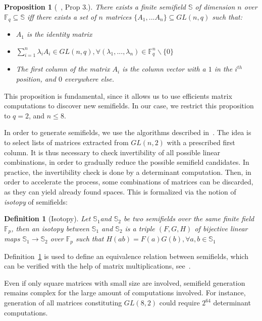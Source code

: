 \documentclass{article}\usepackage{amsthm}
\newtheorem{mydef}{Definition}
\newtheorem{mypropo}{Proposition}
\begin{document}
\begin{mypropo}[~\cite{Combarro:2011:advances_sf}, Prop 3.]
There exists a finite semifield $\mathbb{S}$ of dimension $n$ over $ \mathbb{F}_q \subseteq \mathbb{S} $ iff there exists a set of $n$ matrices  $\{A_1,...A_n\} \subseteq GL(n,q)$ such that: 
\begin{itemize}
\item $A_1$ is the identity matrix
\item $\displaystyle\sum_{i=1}^n \lambda_iA_i \in GL(n,q), \forall (\lambda_1,...,\lambda_n) \in \mathbb{F}_q^n  \backslash \{0\} $ 
\item The first column of the matrix $A_i$ is the column vector with a $1$ in the $i^{th}$ position, and $0$ everywhere else.\\
\end{itemize}
\end{mypropo}


This proposition is fundamental, since it allows us to use efficients matrix computations to discover new semifields.
In our case, we restrict this proposition to $q=2$, and $n \le 8 $. 

In order to generate semifields, we use the algorithms described in~\cite{Rua:2009:classification_sf}. 
The idea is to select lists of matrices extracted from $GL(n,2)$ with a prescribed first column.
It is thus necessary to check invertibility of all possible linear combinations, in order to gradually reduce the possible semifield candidates.
In practice, the invertibility check is done by a determinant computation.
Then, in order to accelerate the process, some combinations of matrices can be discarded, as they can yield already found spaces. This is formalized via the notion of {\em isotopy} of semifields:
\begin{mydef}[Isotopy]\label{def:isotopy}
Let $\mathbb{S}_1$and $\mathbb{S}_2$ be two semifields over the same finite field $\mathbb{F}_p$, then an isotopy between $\mathbb{S}_1$ and $\mathbb{S}_2$ is a triple $(F,G,H)$ of bijective linear maps $\mathbb{S}_1 \to \mathbb{S}_2$ over $\mathbb{F}_p$ such that $H(ab) = F(a)G(b), \forall a,b \in \mathbb{S}_1$
\end{mydef}
Definition~\ref{def:isotopy} is used to define an equivalence relation between semifields, which can be verified with the help of matrix multiplications, see~\cite[Prop. 2]{Combarro:2011:advances_sf}.





Even if only square matrices with small size are involved, semifield generation remains complex for the large amount of computations involved. 
For instance, generation of all matrices constituting $GL(8,2)$ could require $2^{64}$ determinant computations. 
\end{document}
